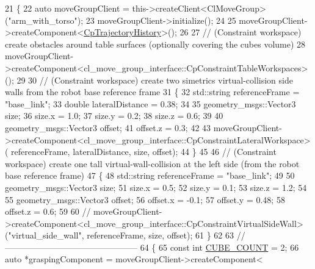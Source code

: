 \begin{DoxyCode}
21         \{
22             \textcolor{keyword}{auto} moveGroupClient = this->createClient<ClMoveGroup>(\textcolor{stringliteral}{"arm\_with\_torso"});
23             moveGroupClient->initialize();
24 
25             moveGroupClient->createComponent<\hyperlink{classcl__move__group__interface_1_1CpTrajectoryHistory}{CpTrajectoryHistory}>();
26 
27             \textcolor{comment}{// (Constraint workspace) create obstacles around table surfaces (optionally covering the cubes
       volume)}
28             moveGroupClient->createComponent<cl\_move\_group\_interface::CpConstraintTableWorkspaces>();
29 
30             \textcolor{comment}{// (Constraint workspace) create two simetrics virtual-collision side walls from the robot base
       reference frame}
31             \{
32                 std::string referenceFrame = \textcolor{stringliteral}{"base\_link"};
33                 \textcolor{keywordtype}{double} lateralDistance = 0.38;
34 
35                 geometry\_msgs::Vector3 size;
36                 size.x = 1.0;
37                 size.y = 0.2;
38                 size.z = 0.6;
39 
40                 geometry\_msgs::Vector3 offset;
41                 offset.z = 0.3;
42 
43                 moveGroupClient->createComponent<cl\_move\_group\_interface::CpConstraintLateralWorkspace>(
      referenceFrame, lateralDistance, size, offset);
44             \}
45 
46             \textcolor{comment}{// (Constraint workspace) create one tall virtual-wall-collision at the left side (from the
       robot base reference frame)}
47             \{
48                 std::string referenceFrame = \textcolor{stringliteral}{"base\_link"};
49 
50                 geometry\_msgs::Vector3 size;
51                 size.x = 0.5;
52                 size.y = 0.1;
53                 size.z = 1.2;
54 
55                 geometry\_msgs::Vector3 offset;
56                 offset.x = -0.1;
57                 offset.y = 0.48;
58                 offset.z = 0.6;
59 
60                 \textcolor{comment}{//
      moveGroupClient->createComponent<cl\_move\_group\_interface::CpConstraintVirtualSideWall>("virtual\_side\_wall", referenceFrame, size, offset);}
61             \}
62 
63             \textcolor{comment}{//-----------------------------------------------}
64             \{
65                 \textcolor{keyword}{const} \textcolor{keywordtype}{int} \hyperlink{namespacesm__moveit__wine__serve_ac6a021cad03473894d9b5adfd589f49b}{CUBE\_COUNT} = 2;
66                 \textcolor{keyword}{auto} *graspingComponent = moveGroupClient->createComponent<

\end{DoxyCode}
